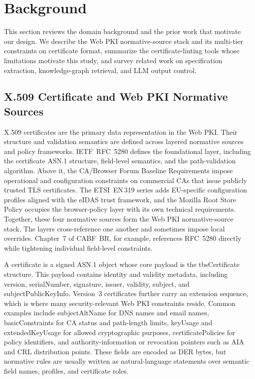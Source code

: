 \section{Background}
\label{sec:background}

This section reviews the domain background and the prior work that motivate our design. We describe the Web PKI normative-source stack and its multi-tier constraints on certificate format, summarize the certificate-linting tools whose limitations motivate this study, and survey related work on specification extraction, knowledge-graph retrieval, and LLM output control.

\subsection{X.509 Certificate and Web PKI Normative Sources}
\label{sec:bg-pki}

X.509 certificates are the primary data representation in the Web PKI. Their structure and validation semantics are defined across layered normative sources and policy frameworks. IETF~RFC~5280 defines the foundational layer, including the certificate ASN.1 structure, field-level semantics, and the path-validation algorithm. Above it, the CA/Browser Forum Baseline Requirements impose operational and configuration constraints on commercial CAs that issue publicly trusted TLS certificates. The ETSI~EN\,319 series adds EU-specific configuration profiles aligned with the eIDAS trust framework, and the Mozilla Root Store Policy occupies the browser-policy layer with its own technical requirements. Together, these four normative sources form the Web PKI normative-source stack. The layers cross-reference one another and sometimes impose local overrides. Chapter~7 of CABF~BR, for example, references RFC~5280 directly while tightening individual field-level constraints.

A certificate is a signed ASN.1 object whose core payload is the tbsCertificate structure. This payload contains identity and validity metadata, including version, serialNumber, signature, issuer, validity, subject, and subjectPublicKeyInfo. Version~3 certificates further carry an extension sequence, which is where many security-relevant Web PKI constraints reside. Common examples include subjectAltName for DNS names and email names, basicConstraints for CA status and path-length limits, keyUsage and extendedKeyUsage for allowed cryptographic purposes, certificatePolicies for policy identifiers, and authority-information or revocation pointers such as AIA and CRL distribution points. These fields are encoded as DER bytes, but normative rules are usually written as natural-language statements over semantic field names, profiles, and certificate roles.

